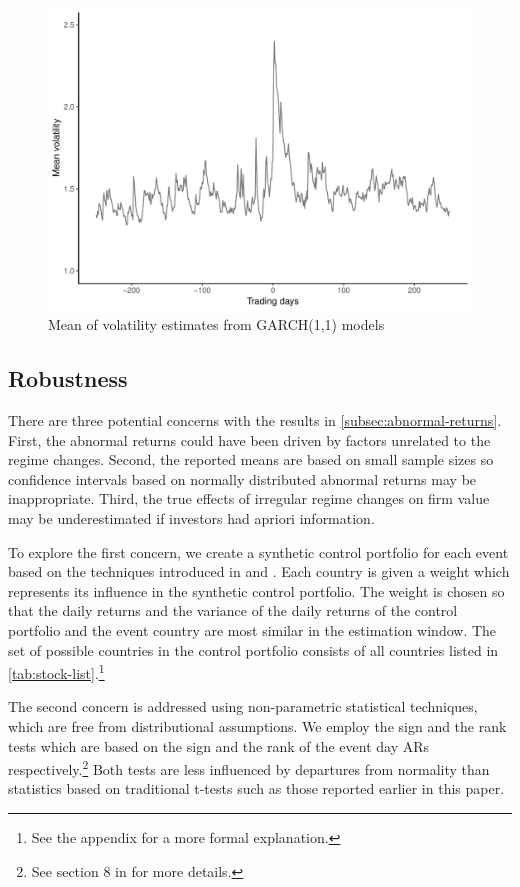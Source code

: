 \documentclass[12pt,final,fleqn]{article}
\theoremstyle{plain}
\begin{document}
\begin{figure}[htb]
\includegraphics{../figs/mean-volatility.pdf}
\caption{Mean of volatility estimates from GARCH(1,1) models}
\label{fig:volatility}
\end{figure}

\subsection{Robustness} \label{subsec: Robustness}
There are three potential concerns with the results in \autoref{subsec:abnormal-returns}. First, the abnormal returns could have been driven by factors unrelated to the regime changes. Second, the reported means are based on small sample sizes so confidence intervals based on normally distributed abnormal returns may be inappropriate. Third, the true effects of irregular regime changes on firm value may be underestimated if investors had apriori information.

To explore the first concern, we create a synthetic control portfolio for each event based on the techniques introduced in \citet{abadie2003economic} and \citet{abadie2010synthetic}. Each country is given a weight which represents its influence in the synthetic control portfolio. The weight is chosen so that the daily returns and the variance of the daily returns of the control portfolio and the event country are most similar in the estimation window. The set of possible countries in the control portfolio consists of all countries listed in \autoref{tab:stock-list}.\footnote{See the appendix for a more formal explanation.}

The second concern is addressed using non-parametric statistical techniques, which are free from distributional assumptions. We employ the sign and the rank tests which are based on the sign and the rank of the event day ARs respectively.\footnote{See section 8 in \citet{mackinlay1997event} for more details.} Both tests are less influenced by departures from normality than statistics based on traditional t-tests such as those reported earlier in this paper.
\end{document}
